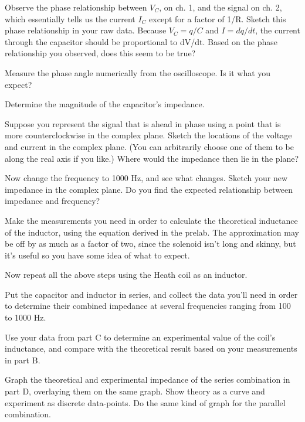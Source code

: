 Observe the phase relationship between $V_C$, on ch. 1, and
the signal on ch. 2, which essentially tells us the current
$I_C$ except for a factor of 1/R. Sketch this phase
relationship in your raw data. Because $V_C=q/C$ and
$I=dq/dt$, the current through the capacitor should be
proportional to dV/dt. Based on the phase relationship you
observed, does this seem to be true?

Measure the phase angle numerically from the oscilloscope.
Is it what you expect?

Determine the magnitude of the capacitor's impedance.

Suppose you represent the signal that is ahead in phase
using a point that is more counterclockwise in the complex
plane. Sketch the locations of the voltage and current in
the complex plane. (You can arbitrarily choose one of them
to be along the real axis if you like.) Where would the
impedance then lie in the plane?

Now change the frequency to 1000 Hz, and see what changes.
Sketch your new impedance in the complex plane. Do you find
the expected relationship between impedance and frequency?


Make the measurements you need in order to calculate the
theoretical inductance of the inductor, using the equation
derived in the prelab. The approximation may be off by as
much as a factor of two, since the solenoid isn't long and
skinny, but it's useful so you have some idea of what to expect.


Now repeat all the above steps using the Heath coil as an inductor. 


Put the capacitor and inductor in series, and collect the
data you'll need in order to determine their combined
impedance at several frequencies ranging from 100 to 1000 Hz. 

\analysis

Use your data from part C to determine an experimental
value of the coil's inductance, and compare with the
theoretical result based on your measurements in part B.

Graph the theoretical and experimental impedance of the
series combination in part D, overlaying them on the same
graph. Show theory as a curve and experiment as discrete
data-points. Do the same kind of graph for the parallel combination.
